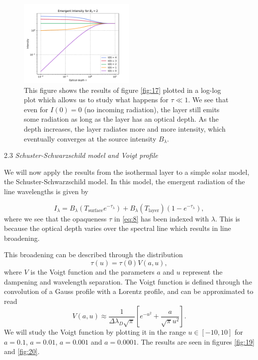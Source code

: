 \documentclass[a4paper,11.5pt,]{article}
\begin{document}
\begin{multicols}{2}
\begin{figure}[H]
	\centering
	\includegraphics[width=0.5\textwidth]{SSA/figures/opticaldepthlog.pdf}
	\caption{This figure shows the results of figure \ref{fig:17} plotted in a log-log plot which allows us to study what happens for $\tau \ll 1$. We see that even for  $I(0) = 0$ (no incoming radiation), the layer still emits some radiation as long as the layer has an optical depth. As the depth increases, the layer radiates more and more intensity, which eventually converges at the source intensity $B_\lambda$.}
	\label{fig:18}
\end{figure}

\begin{center}
2.3\textit{ Schuster-Schwarzschild model and Voigt profile}
\end{center}



We will now apply the results from the isothermal layer to a simple solar model, the Schuster-Schwarzschild model. In this model, the emergent radiation of the line wavelengths is given by

\begin{equation}\label{eq:8}
    I_\lambda = B_\lambda (T_\text{surface}e^{-\tau_\lambda }) + B_\lambda (T_\text{layer}) (1-e^{-\tau_\lambda}),
\end{equation}
where we see that the opaqueness $\tau$ in \eqref{eq:8} has been indexed with $\lambda$. This is because the optical depth varies over the spectral line which results in line broadening.

 \noindent This broadening can be described through the distribution 
\begin{equation}
    \tau(u) = \tau(0) V(a,u),
\end{equation}
where $V$ is the Voigt function and the parameters $a$ and $u$ represent the dampening and wavelength separation. The Voigt function is defined through the convolution of a Gauss profile with a Lorentz profile, and can be approximated to read
\begin{equation}\label{eq:10}
    V(a,u) \approx \frac{1}{\Delta \lambda_D \sqrt{\pi}} \left[ e^{-u^2} + \frac{a}{\sqrt{\pi}u^2} \right].
\end{equation}
We will study the Voigt function by plotting it in the range $u \in [-10,10]$ for $a=0.1$, $a = 0.01$, $a = 0.001$ and $a = 0.0001$. The results are seen in figures \ref{fig:19} and \ref{fig:20}.


\end{multicols}
\end{document}
